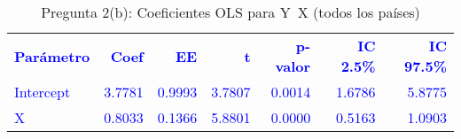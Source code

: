 \begin{table}[H]
\centering
\caption{Pregunta 2(b): Coeficientes OLS para Y~X (todos los países)}
\label{tab:q2b_coefs}
\begin{tabular}{lrrrrrr}
\rowcolor{blue!10}
\toprule
\rowcolor{blue!20}
\textcolor{blue}{\textbf{Parámetro}} & \textcolor{blue}{\textbf{Coef}} & \textcolor{blue}{\textbf{EE}} & \textcolor{blue}{\textbf{t}} & \textcolor{blue}{\textbf{p-valor}} & \textcolor{blue}{\textbf{IC 2.5\%}} & \textcolor{blue}{\textbf{IC 97.5\%}} \\
\addlinespace
\rowcolor{blue!10}
\textcolor{blue}{Intercept} & \textcolor{blue}{3.7781} & \textcolor{blue}{0.9993} & \textcolor{blue}{3.7807} & \textcolor{blue}{0.0014} & \textcolor{blue}{1.6786} & \textcolor{blue}{5.8775} \\
\rowcolor{blue!10}
\textcolor{blue}{X} & \textcolor{blue}{0.8033} & \textcolor{blue}{0.1366} & \textcolor{blue}{5.8801} & \textcolor{blue}{0.0000} & \textcolor{blue}{0.5163} & \textcolor{blue}{1.0903} \\
\bottomrule
\end{tabular}
\end{table}
